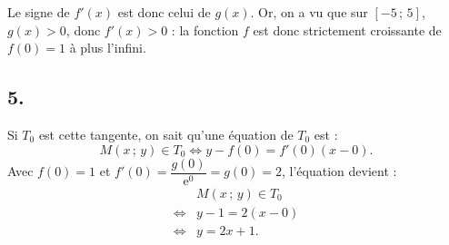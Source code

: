 \documentclass[10pt]{article}
\providecommand{\e}{{\mathrm{e}}}
\begin{document}
Le signe de \(f'(x)\) est donc celui de \(g(x)\). Or, on a vu que sur \([-5\,;\,5]\), \(g(x) > 0\), donc \(f'(x) > 0\) : la fonction \(f\) est donc strictement croissante de \(f(0) = 1\) à plus l'infini.

\subsection*{5.}

Si \(T_0\) est cette tangente, on sait qu'une équation de \(T_0\) est :
\[
M(x\,;\,y) \in T_0 \iff y - f(0) = f'(0)(x - 0).
\]
Avec \(f(0) = 1\) et \(f'(0) = \dfrac{g(0)}{\e^0}= g(0) = 2\), l'équation devient :
\begin{align*}
&M(x\,;\,y) \in T_0 \\
\iff &y - 1 = 2(x - 0) \\
\iff &y = 2x + 1.
\end{align*}
\end{document}
